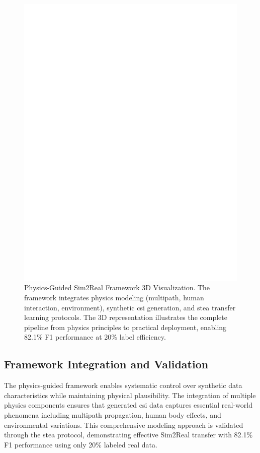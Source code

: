 \documentclass[journal]{IEEEtran}
\begin{document}
\begin{figure}[ht]
\centering
\includegraphics[width=\columnwidth]{figures/figure6_physics_3d_framework_basic.pdf}
\caption{Physics-Guided Sim2Real Framework 3D Visualization. The framework integrates physics modeling (multipath, human interaction, environment), synthetic \gls{csi} generation, and \gls{stea} transfer learning protocols. The 3D representation illustrates the complete pipeline from physics principles to practical deployment, enabling 82.1\% F1 performance at 20\% label efficiency.}
\label{fig:physics_3d_framework}
\end{figure}

\subsection{Framework Integration and Validation}

The physics-guided framework enables systematic control over synthetic data characteristics while maintaining physical plausibility. The integration of multiple physics components ensures that generated \gls{csi} data captures essential real-world phenomena including multipath propagation, human body effects, and environmental variations. This comprehensive modeling approach is validated through the \gls{stea} protocol, demonstrating effective Sim2Real transfer with 82.1\% F1 performance using only 20\% labeled real data.
\end{document}
